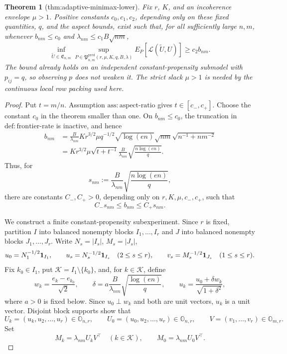 \documentclass{article}
\newtheorem{theorem}{Theorem}
\begin{document}
\begin{theorem}[thm:adaptive-minimax-lower]\label{thm:adaptive-minimax-lower}
Fix \(r\), \(K\), and an incoherence envelope \(\mu>1\).  Positive constants \(c_0,c_1,c_2\), depending only on these fixed quantities, \(q\), and the aspect bounds, exist such that, for all sufficiently large \(n,m\), whenever \(b_{nm}\le c_0\) and \(\lambda_{nm}\le c_1B\sqrt{nm}\),
\[
 \inf_{\widetilde U\in\mathfrak E_{n,m}}
 \sup_{P\in\mathfrak P^{\mathrm{pred}}_{n,m}(r,\mu,K,q,B,\lambda)}
 E_P[\mathcal L(\widetilde U,U)]\ge c_2b_{nm}.
\]
The bound already holds on an independent constant-propensity submodel with \(p_{ij}=q\), so observing \(p\) does not weaken it.  The strict slack \(\mu>1\) is needed by the continuous local row packing used here.
\end{theorem}
\begin{proof}
Put \(t=m/n\).  Assumption \(\mathrm{ass:aspect\mbox{-}ratio}\) gives \(t\in[c_-,c_+]\).  Choose the constant \(c_0\) in the theorem smaller than one.  On \(b_{nm}\le c_0\), the truncation in \(\mathrm{def:frontier\mbox{-}rate}\) is inactive, and hence
\[
 \begin{aligned}
 b_{nm}
 &=\frac{B}{\lambda_{nm}}K r^{3/2}\mu q^{-1/2}
   \sqrt{\log(en)}\sqrt{nm}\sqrt{n^{-1}+nm^{-2}}\\
 &=K r^{3/2}\mu\sqrt{t+t^{-1}}
   \frac{B}{\lambda_{nm}}\sqrt{\frac{n\log(en)}q}.
 \end{aligned}
\]
Thus, for
\[
 s_{nm}:=\frac{B}{\lambda_{nm}}\sqrt{\frac{n\log(en)}q},
\]
there are constants \(C_-,C_+>0\), depending only on \(r,K,\mu,c_-,c_+\), such that
\[
 C_-s_{nm}\le b_{nm}\le C_+s_{nm}.
 \tag{1}
\]

We construct a finite constant-propensity subexperiment.  Since \(r\) is fixed, partition \(I\) into balanced nonempty blocks \(I_1,\ldots,I_r\) and \(J\) into balanced nonempty blocks \(J_1,\ldots,J_r\).  Write \(N_s=|I_s|\), \(M_s=|J_s|\),
\[
 u_0=N_1^{-1/2}{\bf1}_{I_1},\qquad
 u_s=N_s^{-1/2}{\bf1}_{I_s}\quad(2\le s\le r),
 \qquad v_s=M_s^{-1/2}{\bf1}_{J_s}\quad(1\le s\le r).
\]
Fix \(k_0\in I_1\), put \(\mathcal K=I_1\setminus\{k_0\}\), and, for \(k\in\mathcal K\), define
\[
 w_k=\frac{e_k-e_{k_0}}{\sqrt2},\qquad
 \delta=a\frac{B}{\lambda_{nm}}\sqrt{\frac{\log(en)}q},
 \qquad u_k=\frac{u_0+\delta w_k}{\sqrt{1+\delta^2}},
 \tag{2}
\]
where \(a>0\) is fixed below.  Since \(u_0\perp w_k\) and both are unit vectors, \(u_k\) is a unit vector.  Disjoint block supports show that
\[
 U_k=(u_k,u_2,\ldots,u_r)\in\mathbb O_{n,r},
 \qquad U_0=(u_0,u_2,\ldots,u_r)\in\mathbb O_{n,r},
 \qquad V=(v_1,\ldots,v_r)\in\mathbb O_{m,r}.
\]
Set
\[
 M_k=\lambda_{nm}U_kV^\top\quad(k\in\mathcal K),
 \qquad M_0=\lambda_{nm}U_0V^\top.
 \tag{3}
\]


\end{proof}
\end{document}
